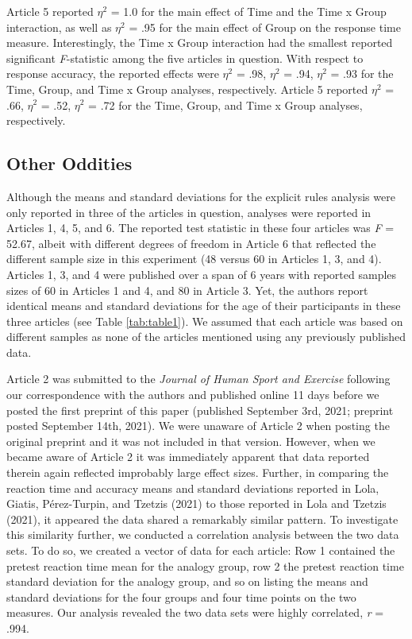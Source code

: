 \documentclass[
  english,
  man, donotrepeattitle,floatsintext]{apa7}
\begin{document}
Article 5 reported \(\eta^{2}\) = 1.0 for the main effect of Time and the Time x Group interaction, as well as \(\eta^{2}\) = .95 for the main effect of Group on the response time measure. Interestingly, the Time x Group interaction had the smallest reported significant \emph{F}-statistic among the five articles in question. With respect to response accuracy, the reported effects were \(\eta^{2}\) = .98, \(\eta^{2}\) = .94, \(\eta^{2}\) = .93 for the Time, Group, and Time x Group analyses, respectively. Article 5 reported \(\eta^{2}\) = .66, \(\eta^{2}\) = .52, \(\eta^{2}\) = .72 for the Time, Group, and Time x Group analyses, respectively.

\hypertarget{other-oddities}{%
\subsection{Other Oddities}\label{other-oddities}}

Although the means and standard deviations for the explicit rules analysis were only reported in three of the articles in question, analyses were reported in Articles 1, 4, 5, and 6. The reported test statistic in these four articles was \emph{F} = 52.67, albeit with different degrees of freedom in Article 6 that reflected the different sample size in this experiment (48 versus 60 in Articles 1, 3, and 4). Articles 1, 3, and 4 were published over a span of 6 years with reported samples sizes of 60 in Articles 1 and 4, and 80 in Article 3. Yet, the authors report identical means and standard deviations for the age of their participants in these three articles (see Table \ref{tab:table1}). We assumed that each article was based on different samples as none of the articles mentioned using any previously published data.

Article 2 was submitted to the \emph{Journal of Human Sport and Exercise} following our correspondence with the authors and published online 11 days before we posted the first preprint of this paper (published September 3rd, 2021; preprint posted September 14th, 2021). We were unaware of Article 2 when posting the original preprint and it was not included in that version. However, when we became aware of Article 2 it was immediately apparent that data reported therein again reflected improbably large effect sizes. Further, in comparing the reaction time and accuracy means and standard deviations reported in Lola, Giatis, Pérez-Turpin, and Tzetzis (2021) to those reported in Lola and Tzetzis (2021), it appeared the data shared a remarkably similar pattern. To investigate this similarity further, we conducted a correlation analysis between the two data sets. To do so, we created a vector of data for each article: Row 1 contained the pretest reaction time mean for the analogy group, row 2 the pretest reaction time standard deviation for the analogy group, and so on listing the means and standard deviations for the four groups and four time points on the two measures. Our analysis revealed the two data sets were highly correlated, \emph{r} = .994.
\end{document}
